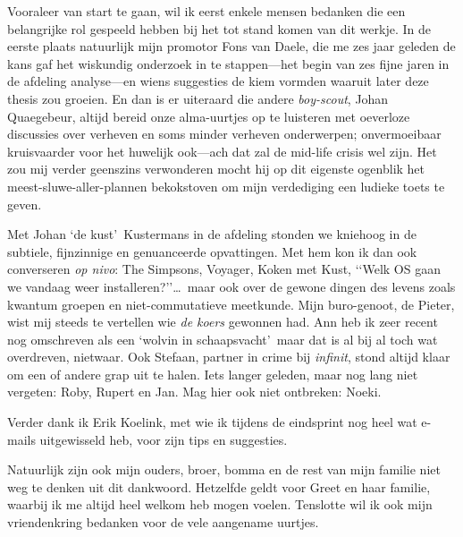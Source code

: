 
Vooraleer van start te gaan, wil ik eerst enkele mensen bedanken
die een belangrijke rol gespeeld hebben bij het tot stand komen van dit werkje.
In de eerste plaats natuurlijk mijn promotor Fons van Daele,
die me zes jaar geleden de kans gaf het wiskundig onderzoek in
te stappen---het begin van zes fijne jaren in de afdeling analyse---en wiens
suggesties de kiem vormden waaruit later deze thesis zou groeien.
En dan is er uiteraard die andere \textsl{boy-scout}, Johan Quaegebeur,
altijd bereid onze alma-uurtjes op te luisteren met oeverloze discussies
over verheven en soms minder verheven onderwerpen;
onvermoeibaar kruisvaarder voor het huwelijk ook---ach dat zal de
mid-life crisis wel zijn. Het zou mij verder geenszins verwonderen mocht hij
op dit eigenste ogenblik het meest-sluwe-aller-plannen bekokstoven om mijn
verdediging een ludieke toets te geven.

Met Johan \lq de kust\rq\ Kustermans in de afdeling stonden we kniehoog in de
subtiele, fijnzinnige en genuanceerde opvattingen.
Met hem kon ik dan ook converseren \textsl{op nivo\/}:
The Simpsons, Voyager, Koken met Kust, \lq\lq Welk OS gaan we vandaag weer
installeren?\rq\rq\ldots\
maar ook over de gewone dingen des levens zoals kwantum groepen en niet-commutatieve
meetkunde.
Mijn buro-genoot, de Pieter, wist mij steeds te vertellen wie \textsl{de koers\/} gewonnen had.
Ann heb ik zeer recent nog omschreven als een \lq wolvin in schaapsvacht\rq\
maar dat is al bij al toch wat overdreven, nietwaar.
Ook Stefaan, partner in crime bij \textsl{infinit}, stond altijd klaar om een of
andere grap uit te halen.
Iets langer geleden, maar nog lang niet vergeten: Roby, Rupert en Jan.
Mag hier ook niet ontbreken: Noeki.
\vspace{1ex}

Verder dank ik Erik Koelink, met wie ik tijdens de eindsprint nog heel wat
e-mails uitgewisseld heb, voor zijn tips en suggesties.
\vspace{1ex}

Natuurlijk zijn ook mijn ouders, broer, bomma en de rest van mijn familie niet
weg te denken uit dit dankwoord.
Hetzelfde geldt voor Greet en haar familie, waarbij ik me altijd heel welkom heb mogen
voelen. Tenslotte wil ik ook mijn vriendenkring bedanken voor de vele aangename uurtjes.
